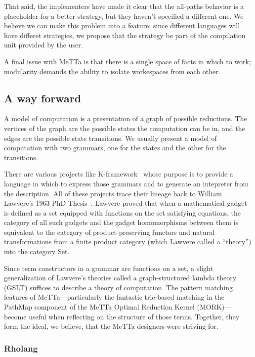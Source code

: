 \documentclass{article}
\begin{document}
That said, the implementers have made it clear that the all-paths behavior is a placeholder for a better strategy, but they haven't specified a different one.  We believe we can make this problem into a feature: since different languages will have differet strategies, we propose that the strategy be part of the compilation unit provided by the user.

A final issue with MeTTa is that there is a single space of facts in which to work; modularity demands the ability to isolate workespaces from each other.

\subsection{A way forward}

A model of computation is a presentation of a graph of possible reductions.  The vertices of the graph are the possible states the computation can be in, and the edges are the possible state transitions.  We usually present a model of computation with two grammars, one for the states and the other for the transitions.

There are various projects like K-framework~\cite{kframework} whose purpose is to provide a language in which to express those grammars and to generate an intepreter from the description.  All of these projects trace their lineage back to William Lawvere's 1963 PhD Thesis~\cite{Lawvere1963}.  Lawvere proved that when a mathematical gadget is defined as a set equipped with functions on the set satisfying equations, the category of all such gadgets and the gadget homomorphisms between them is equivalent to the category of product-preserving functors and natural transformations from a finite product category (which Lawvere called a ``theory'') into the category Set.

Since term constructors in a grammar are functions on a set, a slight generalization of Lawvere's theories called a graph-structured lambda theory (GSLT) suffices to describe a theory of computation.  The pattern matching features of MeTTa---particularly the fantastic trie-based matching in the PathMap component of the MeTTa Optimal Reduction Kernel (MORK)---become useful when reflecting on the structure of those terms.  Together, they form the ideal, we believe, that the MeTTa designers were striving for.

\subsubsection{Rholang}
\end{document}
